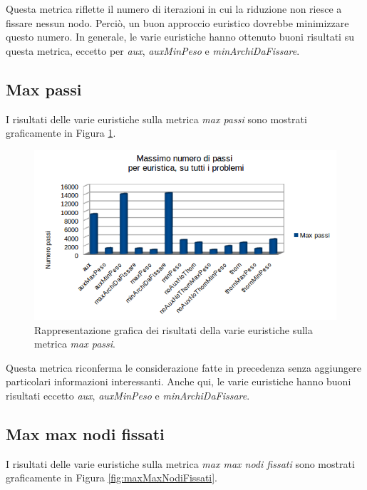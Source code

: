 Questa metrica riflette il numero di iterazioni in cui la riduzione non riesce a fissare nessun nodo. Perciò, un buon approccio euristico dovrebbe minimizzare questo numero. In generale, le varie euristiche hanno ottenuto buoni risultati su questa metrica, eccetto per \textit{aux}, \textit{auxMinPeso} e \textit{minArchiDaFissare}.

\subsection{Max passi}
I risultati delle varie euristiche sulla metrica \textit{max passi} sono mostrati graficamente in Figura \ref{fig:maxPassi}.

\begin{figure}[H]
\includegraphics[width=\textwidth]{res/img/maxPassi.png}
\caption{Rappresentazione grafica dei risultati della varie euristiche sulla metrica \textit{max passi}.}
\label{fig:maxPassi}
\end{figure}

Questa metrica riconferma le considerazione fatte in precedenza senza aggiungere particolari informazioni interessanti. Anche qui, le varie euristiche hanno buoni risultati eccetto \textit{aux}, \textit{auxMinPeso} e \textit{minArchiDaFissare}.

\subsection{Max max nodi fissati}
I risultati delle varie euristiche sulla metrica \textit{max max nodi fissati} sono mostrati graficamente in Figura \ref{fig:maxMaxNodiFissati}.

